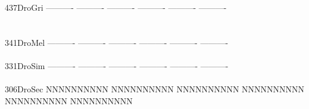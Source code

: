 \documentclass[11pt,twoside,reqno,a4paper]{article}
\begin{document}
{437\hspace*{1\charwidth}DroGri	----------	----------	----------	----------	----------	----------	\\
\hspace*{4\charwidth}\hspace*{7\charwidth}\hspace*{1\charwidth}\hspace*{1\charwidth}\hspace*{1\charwidth}\hspace*{1\charwidth}\hspace*{1\charwidth}\hspace*{1\charwidth}\\
\\
341\hspace*{1\charwidth}DroMel	----------	----------	----------	----------	----------	----------	\\
\hspace*{4\charwidth}\hspace*{7\charwidth}\hspace*{1\charwidth}\hspace*{1\charwidth}\hspace*{1\charwidth}\hspace*{1\charwidth}\hspace*{1\charwidth}\hspace*{1\charwidth}\\
331\hspace*{1\charwidth}DroSim	----------	----------	----------	----------	----------	----------	\\
\hspace*{4\charwidth}\hspace*{7\charwidth}\hspace*{1\charwidth}\hspace*{1\charwidth}\hspace*{1\charwidth}\hspace*{1\charwidth}\hspace*{1\charwidth}\hspace*{1\charwidth}\\
306\hspace*{1\charwidth}DroSec	NNNNNNNNNN	NNNNNNNNNN	NNNNNNNNNN	NNNNNNNNNN	NNNNNNNNNN	NNNNNNNNNN	\\
\hspace*{4\charwidth}\hspace*{7\charwidth}\hspace*{1\charwidth}\hspace*{1\charwidth}\hspace*{1\charwidth}\hspace*{1\charwidth}\hspace*{1\charwidth}\hspace*{1\charwidth}\\
}
\end{document}
